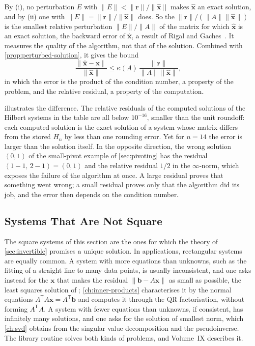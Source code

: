 By (i), no perturbation $E$ with $\|E\|<\|\mathbf r\|/\|\hat{\mathbf x}\|$ makes $\hat{\mathbf x}$ an exact solution, and by (ii) one with $\|E\|=\|\mathbf r\|/\|\hat{\mathbf x}\|$ does. So the  $\|\mathbf r\|/(\|A\|\|\hat{\mathbf x}\|)$ is the smallest relative perturbation $\|E\|/\|A\|$ of the matrix for which $\hat{\mathbf x}$ is an exact solution, the backward error of $\hat{\mathbf x}$, a result of Rigal and Gaches~\cite{rigal1967}. It measures the quality of the algorithm, not that of the solution. Combined with \cref{prop:perturbed-solution}, it gives the bound
\[
\frac{\|\hat{\mathbf x}-\mathbf x\|}{\|\hat{\mathbf x}\|}\le\kappa(A)\,\frac{\|\mathbf r\|}{\|A\|\|\hat{\mathbf x}\|},
\]
in which the error is the product of the condition number, a property of the problem, and the relative residual, a property of the computation.

 illustrates the difference. The relative residuals of the computed solutions of the Hilbert systems in the table are all below $10^{-16}$, smaller than the unit roundoff: each computed solution is the exact solution of a system whose matrix differs from the stored $H_n$ by less than one rounding error. Yet for $n=14$ the error is larger than the solution itself. In the opposite direction, the wrong solution $(0,1)$ of the small-pivot example of \cref{sec:pivoting} has the residual $(1-1,\,2-1)=(0,1)$ and the relative residual $1/2$ in the $\infty$-norm, which exposes the failure of the algorithm at once. A large residual proves that something went wrong; a small residual proves only that the algorithm did its job, and the error then depends on the condition number.

\subsection{Systems That Are Not Square}

The square systems of this section are the ones for which the theory of \cref{sec:invertible} promises a unique solution. In applications, rectangular systems are equally common. A system with more equations than unknowns, such as the fitting of a straight line to many data points, is usually inconsistent, and one asks instead for the $\mathbf x$ that makes the residual $\|\mathbf b-A\mathbf x\|$ as small as possible, the least squares solution of ; \cref{ch:inner-products} characterises it by the normal equations $A^{\mathsf T}A\mathbf x=A^{\mathsf T}\mathbf b$ and computes it through the QR factorisation, without forming $A^{\mathsf T}A$. A system with fewer equations than unknowns, if consistent, has infinitely many solutions, and one asks for the solution of smallest norm, which \cref{ch:svd} obtains from the singular value decomposition and the pseudoinverse. The library routine  solves both kinds of problems, and Volume~IX describes it.

